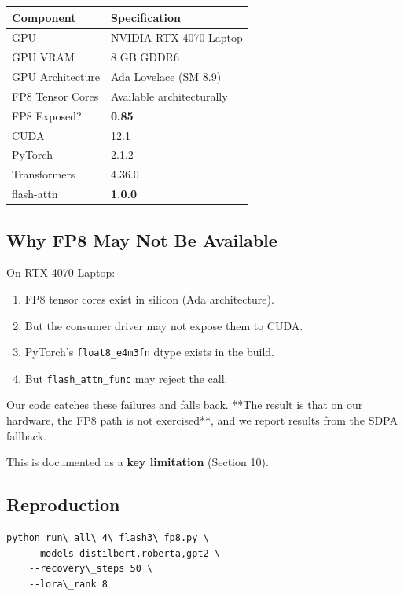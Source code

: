 \begin{table}[H]
\centering
\small
\begin{tabular}{ll}
\toprule
\textbf{Component} & \textbf{Specification} \\
\midrule
GPU & NVIDIA RTX 4070 Laptop \\
GPU VRAM & 8 GB GDDR6 \\
GPU Architecture & Ada Lovelace (SM 8.9) \\
FP8 Tensor Cores & Available architecturally \\
FP8 Exposed? & \textbf{0.85} \\
CUDA & 12.1 \\
PyTorch & 2.1.2 \\
Transformers & 4.36.0 \\
flash-attn & \textbf{1.0.0} \\
\bottomrule
\end{tabular}
\end{table}

\subsection{Why FP8 May Not Be Available}

On RTX 4070 Laptop:

\begin{enumerate}
\item FP8 tensor cores exist in silicon (Ada architecture).
\item But the consumer driver may not expose them to CUDA.
\item PyTorch's \texttt{float8\_e4m3fn} dtype exists in the build.
\item But \texttt{flash\_attn\_func} may reject the call.

\end{enumerate}
Our code catches these failures and falls back. **The result is that on 
our hardware, the FP8 path is not exercised**, and we report results from 
the SDPA fallback.

This is documented as a \textbf{key limitation} (Section 10).

\subsection{Reproduction}

\begin{lstlisting}
python run\_all\_4\_flash3\_fp8.py \
    --models distilbert,roberta,gpt2 \
    --recovery\_steps 50 \
    --lora\_rank 8
\end{lstlisting}

